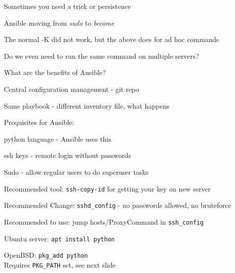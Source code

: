 \documentclass[18pt,landscape,a4paper,footrule]{foils}
\begin{document}
\begin{list2}
\item Sometimes you need a trick or persistence
\item Ansible moving from \emph{sudo} to \emph{become}
\item The normal -K did not work, but the above does for ad hoc commands
\end{list2}




Do we even need to run the same command on multiple servers?

What are the benefits of Ansible?
\begin{list2}
\item Central configuration management - git repo
\item Same playbook - different inventory file, what happens
\item
\end{list2}





Prequisites for Ansible:


\begin{list2}
\item python language - Ansible uses this
\item ssh keys - remote login without passwords
\item Sudo - allow regular users to do superuser tasks
\item Recommended tool: \verb+ssh-copy-id+ for getting your key on new server
\item Recommended Change: \verb+sshd_config+ - no passwords allowed, no bruteforce
\item Recommended to use: jump hosts/ProxyCommand in \verb+ssh_config+
\end{list2}



\begin{list2}
\item Ubuntu server: \verb+apt install python+
\item OpenBSD: \verb+pkg_add python+\\
Requires \verb+PKG_PATH+ set, see next slide
\end{list2}


\end{document}
